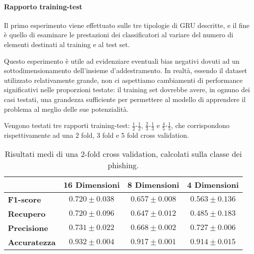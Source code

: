\documentclass[../../main.tex]{subfiles}
\begin{document}
    \paragraph{Rapporto training-test}
    Il primo esperimento viene effettuato sulle tre tipologie di GRU descritte, e il fine è quello di esaminare le prestazioni dei classificatori al variare del numero di elementi destinati al training e al test set. 
    
    Questo esperimento è utile ad evidenziare eventuali bias negativi dovuti ad un sottodimensionamento dell'insieme d'addestramento. In realtà, essendo il dataset utilizzato relativamente grande, non ci aspettiamo cambiamenti di performance significativi nelle proporzioni testate: il training set dovrebbe avere, in ognuno dei casi testati, una grandezza sufficiente per permettere al modello di apprendere il problema al meglio delle sue potenzialità.

    Vengono testati tre rapporti training-test: $\frac{1}{2}$-$\frac{1}{2}$, $\frac{2}{3}$-$\frac{1}{3}$ e $\frac{4}{5}$-$\frac{1}{5}$, che corrispondono rispettivamente ad una 2 fold, 3 fold e 5 fold cross validation.

    \begin{table}[H]
        \centering
        \begin{tabular}{lccc}
            \toprule
            {} &                      \textbf{16 Dimensioni} & \textbf{8 Dimensioni} & \textbf{4 Dimensioni} \\
            \midrule
            \textbf{F1-score }      &      $0.720 \pm 0.038$ & $0.657 \pm 0.008$ & $0.563 \pm 0.136$\\
            \textbf{Recupero   }    &      $0.720 \pm 0.096$ & $0.647 \pm 0.012$ & $0.485 \pm 0.183$\\
            \textbf{Precisione}     &      $0.731 \pm 0.022$ & $0.668 \pm 0.002$ & $0.727 \pm 0.006$\\
            \textbf{Accuratezza }   &      $0.932 \pm 0.004$ & $0.917 \pm 0.001$ & $0.914 \pm 0.015$\\
            \bottomrule
        \end{tabular}
        \caption{Risultati medi di una 2-fold cross validation, calcolati sulla classe dei phishing.}
        \label{tab:2foldCV}
    \end{table}
\end{document}
